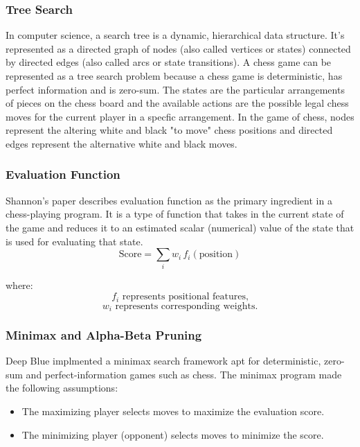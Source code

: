 \documentclass[11pt,a4paper]{report}
\begin{document}
\subsubsection{Tree Search}

In computer science, a search tree is a dynamic, hierarchical data structure. It's represented as a directed graph
of nodes (also called vertices or states) connected by directed edges (also called arcs or state transitions).
A chess game can be represented as a tree search problem because a chess game is deterministic, has perfect
information and is zero-sum. The states are the particular arrangements of pieces on the chess board and
the available actions are the possible legal chess moves for the current player in a specfic arrangement.
In the game of chess, nodes represent the altering white and black "to move" chess positions and directed edges represent the
alternative white and black moves.

\subsubsection{Evaluation Function}
Shannon's paper describes evaluation function as the primary ingredient in a chess-playing program. It is a type of function
that takes in the current state of the game and reduces it to an estimated scalar (numerical) value of the state that is used for
evaluating that state.
\[
\text{Score} = \sum_{i} w_i \, f_i(\text{position})
\]

where:
\[
f_i \text{ represents positional features,}
\]
\[
w_i \text{ represents corresponding weights.}
\]

\subsubsection{Minimax and Alpha-Beta Pruning}
Deep Blue implmented a minimax search framework apt for deterministic, zero-sum and perfect-information games such as chess.
The minimax program made the following assumptions:

\begin{itemize}
    \item The maximizing player selects moves to maximize the evaluation score.
    \item The minimizing player (opponent) selects moves to minimize the score.
\end{itemize}
\end{document}
